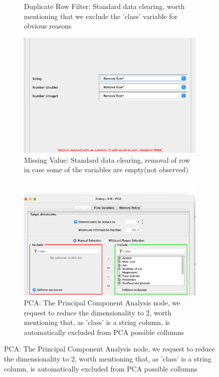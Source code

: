 \documentclass[11pt]{article}
\begin{document}
\begin{figure}[H]
\begin{subfigure}{0.4\textwidth}
					\caption{Duplicate Row Filter:  Standard data clearing, worth mentioning that we exclude the 'class' variable for obvious reasons}
					\label{fig:third}
				\end{subfigure}	
				\begin{subfigure}{0.4\textwidth}
					\includegraphics[scale=0.2]{res/t1/t11/t11-missing-values-conf}
					\caption{Missing Value:  Standard data clearing, removal of row in case some of the variables are empty(not observed)}
					\label{fig:first}
				\end{subfigure}
				\hfill
				\begin{subfigure}{0.4\textwidth}
					\includegraphics[width=\textwidth]{res/t1/t11/t11-PCA-conf}
					\caption{PCA: The Principal Component Analysis node, we request to reduce the dimensionality to 2, worth mentioning that, as 'class' is a string column, is automatically excluded from PCA possible collumns}

\end{subfigure}
\end{figure}
\end{document}
